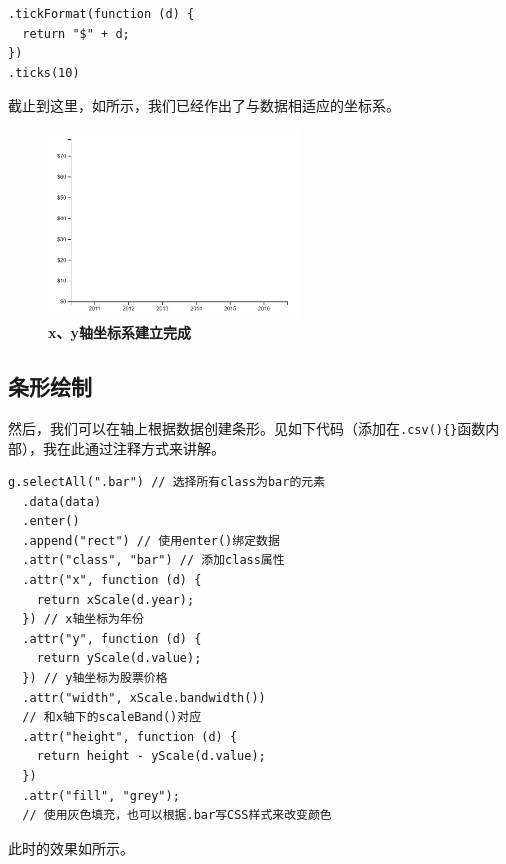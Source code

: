 \begin{verbatim}
.tickFormat(function (d) {
  return "$" + d;
})
.ticks(10)
\end{verbatim}

截止到这里，如所示，我们已经作出了与数据相适应的坐标系。

\begin{figure}[htbp]
    \centering
    \includegraphics[width=0.6\textwidth]{figure/D3/company_axis_xy.png}
    \caption{\textbf{x、y轴坐标系建立完成}}
    \label{fig:company_axis_xy}
\end{figure}

\subsection{条形绘制}

然后，我们可以在轴上根据数据创建条形。见如下代码（添加在\verb|.csv(){}|函数内部），我在此通过注释方式来讲解。

\begin{verbatim}
g.selectAll(".bar") // 选择所有class为bar的元素
  .data(data)
  .enter()
  .append("rect") // 使用enter()绑定数据
  .attr("class", "bar") // 添加class属性
  .attr("x", function (d) {
    return xScale(d.year);
  }) // x轴坐标为年份
  .attr("y", function (d) {
    return yScale(d.value);
  }) // y轴坐标为股票价格
  .attr("width", xScale.bandwidth())
  // 和x轴下的scaleBand()对应
  .attr("height", function (d) {
    return height - yScale(d.value);
  })
  .attr("fill", "grey");
  // 使用灰色填充，也可以根据.bar写CSS样式来改变颜色
\end{verbatim}

此时的效果如所示。

